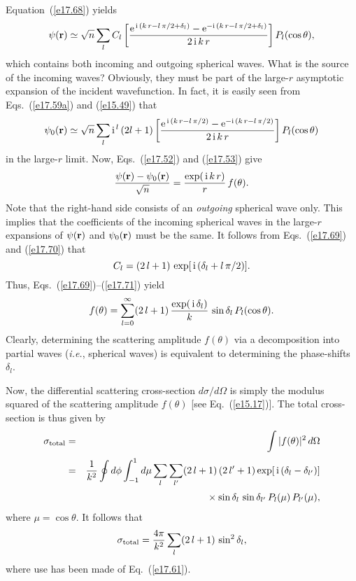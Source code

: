 Equation~(\ref{e17.68}) yields
\begin{equation}
\psi({\bf r}) \simeq \sqrt{n} \sum_l C_l\left[
\frac{{\rm e}^{\,{\rm i}\,(k\,r - l\,\pi/2+ \delta_l)}
-{\rm e}^{-{\rm i}\,(k\,r - l\,\pi/2+ \delta_l)} }{2\,{\rm i}\,k\,r}  \right] P_l(\cos\theta),\label{e17.69}
\end{equation}
which contains both incoming and outgoing spherical waves. What is the
source of the incoming waves? Obviously, they must be part of
the large-$r$ asymptotic expansion of the incident wavefunction. In fact,
it is easily seen from Eqs.~(\ref{e17.59a}) and (\ref{e15.49})
that
\begin{equation}
\psi_0({\bf r}) \simeq \sqrt{n} \sum_l {\rm i}^{\,l}\,
(2l+1)\left[\frac{
{\rm e}^{\,{\rm i}\,(k\,r - l\,\pi/2)}
-{\rm e}^{-{\rm i}\,(k\,r - l\,\pi/2)}}{2\,{\rm i}\,k\,r}  \right]P_l(\cos\theta)\label{e17.70}
\end{equation}
in the large-$r$ limit. Now, Eqs.~(\ref{e17.52}) and (\ref{e17.53}) give
\begin{equation}\label{e17.71}
\frac{\psi({\bf r} )- \psi_0({\bf r}) }{ \sqrt{n}} = 
\frac{\exp(\,{\rm i}\,k\,r)}{r}\,
f(\theta).
\end{equation}
Note that the right-hand side consists  of an {\em outgoing}\/ spherical
wave only. This implies that the coefficients of the incoming spherical waves
in the large-$r$  expansions of $\psi({\bf r})$ and $\psi_0({\bf r})$
must be the same. It follows from Eqs.~(\ref{e17.69}) and (\ref{e17.70}) that
\begin{equation}
C_l = (2\,l+1)\,\exp[\,{\rm i}\,(\delta_l + l\,\pi/2)].
\end{equation} 
Thus, Eqs.~(\ref{e17.69})--(\ref{e17.71}) yield
\begin{equation}\label{e17.73}
f(\theta) = \sum_{l=0}^\infty (2\,l+1)\,\frac{\exp(\,{\rm i}\,\delta_l)}
{k} \,\sin\delta_l\,P_l(\cos\theta).
\end{equation}
Clearly, determining the scattering amplitude
$f(\theta)$  via  a decomposition into
partial waves ({\em i.e.}, spherical waves) is equivalent to determining
the phase-shifts $\delta_l$.

Now, the differential scattering cross-section $d\sigma/d\Omega$ is simply
the modulus squared of the scattering amplitude $f(\theta)$ [see Eq.~(\ref{e15.17})]. The
total cross-section is thus given by
\begin{eqnarray}
\sigma_{\rm total}& = &\int |f(\theta)|^2\,d\Omega\nonumber\\[0.5ex]
&=& \frac{1}{k^2} \oint d\phi \int_{-1}^{1} d\mu
\sum_l \sum_{l'} (2\,l+1)\,(2\,l'+1) 
\exp[\,{\rm i}\,(\delta_l-\delta_{l'})]\nonumber\\[0.5ex]
&&\mbox{\hspace{1cm}}\times  \sin\delta_l \,\sin\delta_{l'}\,
P_l(\mu)\, P_{l'}(\mu),
\end{eqnarray}
where $\mu = \cos\theta$. It follows that
\begin{equation}\label{e17.75}
\sigma_{\rm total} = \frac{4\pi}{k^2} \sum_l (2\,l+1)\,\sin^2\delta_l,
\end{equation}
where use has been made of Eq.~(\ref{e17.61}).

